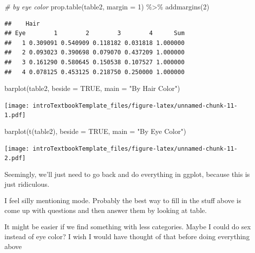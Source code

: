 \documentclass[
]{book}
\newenvironment{Shaded}{\begin{snugshade}}{\end{snugshade}}
\newcommand{\AttributeTok}[1]{\textcolor[rgb]{0.77,0.63,0.00}{#1}}
\newcommand{\CommentTok}[1]{\textcolor[rgb]{0.56,0.35,0.01}{\textit{#1}}}
\newcommand{\ConstantTok}[1]{\textcolor[rgb]{0.00,0.00,0.00}{#1}}
\newcommand{\DecValTok}[1]{\textcolor[rgb]{0.00,0.00,0.81}{#1}}
\newcommand{\FunctionTok}[1]{\textcolor[rgb]{0.00,0.00,0.00}{#1}}
\newcommand{\NormalTok}[1]{#1}
\newcommand{\SpecialCharTok}[1]{\textcolor[rgb]{0.00,0.00,0.00}{#1}}
\newcommand{\StringTok}[1]{\textcolor[rgb]{0.31,0.60,0.02}{#1}}
\theoremstyle{definition}
\theoremstyle{definition}
\theoremstyle{definition}
\theoremstyle{remark}
\begin{document}
\begin{Shaded}
\begin{Highlighting}[]
\CommentTok{\# by eye color}
\FunctionTok{prop.table}\NormalTok{(table2, }\AttributeTok{margin =} \DecValTok{1}\NormalTok{) }\SpecialCharTok{\%\textgreater{}\%} \FunctionTok{addmargins}\NormalTok{(}\DecValTok{2}\NormalTok{)}
\end{Highlighting}
\end{Shaded}

\begin{verbatim}
##    Hair
## Eye        1        2        3        4      Sum
##   1 0.309091 0.540909 0.118182 0.031818 1.000000
##   2 0.093023 0.390698 0.079070 0.437209 1.000000
##   3 0.161290 0.580645 0.150538 0.107527 1.000000
##   4 0.078125 0.453125 0.218750 0.250000 1.000000
\end{verbatim}

\begin{Shaded}
\begin{Highlighting}[]
\FunctionTok{barplot}\NormalTok{(table2, }\AttributeTok{beside =} \ConstantTok{TRUE}\NormalTok{, }\AttributeTok{main =} \StringTok{"By Hair Color"}\NormalTok{)}
\end{Highlighting}
\end{Shaded}

\texttt{[image: introTextbookTemplate\_files/figure-latex/unnamed-chunk-11-1.pdf]}

\begin{Shaded}
\begin{Highlighting}[]
\FunctionTok{barplot}\NormalTok{(}\FunctionTok{t}\NormalTok{(table2), }\AttributeTok{beside =} \ConstantTok{TRUE}\NormalTok{, }\AttributeTok{main =} \StringTok{"By Eye Color"}\NormalTok{)}
\end{Highlighting}
\end{Shaded}

\texttt{[image: introTextbookTemplate\_files/figure-latex/unnamed-chunk-11-2.pdf]}

Seemingly, we'll just need to go back and do everything in ggplot, because this is just ridiculous.

I feel silly mentioning mode. Probably the best way to fill in the stuff above is come up with questions and then answer them by looking at table.

It might be easier if we find something with less categories. Maybe I could do sex instead of eye color? I wish I would have thought of that before doing everything above
\end{document}
